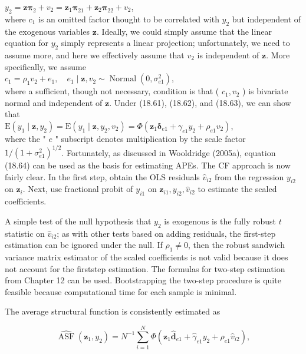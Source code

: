 \documentclass[10pt]{article}
\begin{document}
$y_{2}=\mathbf{z} \boldsymbol{\pi}_{2}+v_{2}=\mathbf{z}_{1} \boldsymbol{\pi}_{21}+\mathbf{z}_{2} \boldsymbol{\pi}_{22}+v_{2}$,\\
where $c_{1}$ is an omitted factor thought to be correlated with $y_{2}$ but independent of the exogenous variables $\mathbf{z}$. Ideally, we could simply assume that the linear equation for $y_{2}$ simply represents a linear projection; unfortunately, we need to assume more, and here we effectively assume that $v_{2}$ is independent of $\mathbf{z}$. More specifically, we assume\\
$c_{1}=\rho_{1} v_{2}+e_{1}, \quad e_{1} \mid \mathbf{z}, v_{2} \sim \operatorname{Normal}\left(0, \sigma_{e 1}^{2}\right)$,\\
where a sufficient, though not necessary, condition is that ( $c_{1}, v_{2}$ ) is bivariate normal and independent of $\mathbf{z}$. Under (18.61), (18.62), and (18.63), we can show that\\
$\mathrm{E}\left(y_{1} \mid \mathbf{z}, y_{2}\right)=\mathrm{E}\left(y_{1} \mid \mathbf{z}, y_{2}, v_{2}\right)=\Phi\left(\mathbf{z}_{1} \boldsymbol{\delta}_{e 1}+\gamma_{e 1} y_{2}+\rho_{e 1} v_{2}\right)$,\\
where the " $e$ " subscript denotes multiplication by the scale factor $1 /\left(1+\sigma_{e 1}^{2}\right)^{1 / 2}$. Fortunately, as discussed in Wooldridge (2005a), equation (18.64) can be used as the basis for estimating APEs. The CF approach is now fairly clear. In the first step, obtain the OLS residuals $\hat{v}_{i 2}$ from the regression $y_{i 2}$ on $\mathbf{z}_{i}$. Next, use fractional probit of $y_{i 1}$ on $\mathbf{z}_{i 1}, y_{i 2}, \hat{v}_{i 2}$ to estimate the scaled coefficients.

A simple test of the null hypothesis that $y_{2}$ is exogenous is the fully robust $t$ statistic on $\hat{v}_{i 2}$; as with other tests based on adding residuals, the first-step estimation can be ignored under the null. If $\rho_{1} \neq 0$, then the robust sandwich variance matrix estimator of the scaled coefficients is not valid because it does not account for the firststep estimation. The formulas for two-step estimation from Chapter 12 can be used. Bootstrapping the two-step procedure is quite feasible because computational time for each sample is minimal.

The average structural function is consistently estimated as


\begin{equation*}
\widehat{\operatorname{ASF}}\left(\mathbf{z}_{1}, y_{2}\right)=N^{-1} \sum_{i=1}^{N} \Phi\left(\mathbf{z}_{1} \hat{\boldsymbol{d}}_{e 1}+\hat{\gamma}_{e 1} y_{2}+\hat{\rho}_{e 1} \hat{v}_{i 2}\right), \tag{18.65}
\end{equation*}
\end{document}
